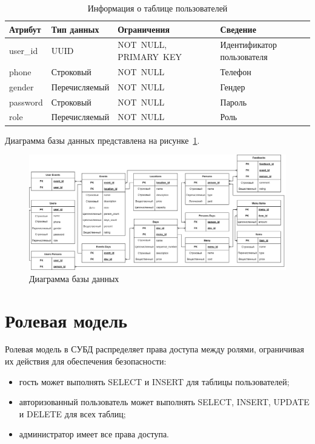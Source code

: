 \begin{table}[h!]
	\centering
	\caption{Информация о таблице пользователей}
	\begin{tabularx}{\textwidth}{|p{2.6cm}|X|p{6cm}|X|}
		\hline
		\textbf{Атрибут} & \textbf{Тип данных} & \textbf{Ограничения} & \textbf{Сведение} \\
		\hline
		user\_id & UUID & NOT~NULL, \newline PRIMARY~KEY & Идентификатор пользователя \\
		\hline
		phone & Строковый & NOT~NULL & Телефон \\
		\hline
		gender & Перечисляемый & NOT~NULL & Гендер \\
		\hline
		password & Строковый & NOT~NULL & Пароль \\
		\hline
		role & Перечисляемый & NOT~NULL & Роль \\
		\hline
	\end{tabularx}
	\label{tbl:users}
\end{table}

\newpage

Диаграмма базы данных представлена на рисунке~\ref{fig:db-diagram-notypes}.

\begin{figure}[h!]
	\centering
	\includegraphics[width=1\textwidth]{images/db-diagram-notypes.png}
	\caption{Диаграмма базы данных} 
	\label{fig:db-diagram-notypes} 
\end{figure}

\section{Ролевая модель}

Ролевая модель в СУБД распределяет права доступа между ролями, ограничивая их действия для обеспечения безопасности:
\begin{itemize}[label=--]
	\item гость может выполнять SELECT и INSERT для таблицы пользователей;
	\item авторизованный пользователь может выполнять SELECT, INSERT, \newline UPDATE и DELETE для всех таблиц;
	\item администратор имеет все права доступа.
\end{itemize}

